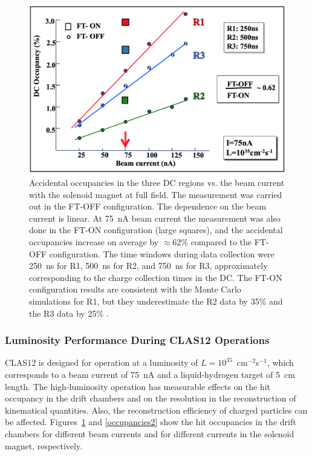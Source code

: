 \documentclass[final,3p]{elsarticle}
\begin{document}
\begin{twocolumn}
\begin{figure}[htbp!]
\centerline{\includegraphics[width=1.0\columnwidth]{random-occupancies.png}}
\caption{Accidental occupancies in the three DC regions vs. the beam current with the solenoid magnet at full field.
  The measurement was carried out in the FT-OFF configuration. The dependence on the beam current is linear.
  At 75~nA beam current the measurement was also done in the FT-ON configuration (large squares), and the
  accidental occupancies increase on average by $\approx$62\% compared to the FT-OFF configuration. The time
  windows during data collection were 250~ns for R1, 500~ns for R2, and 750~ns for R3, approximately corresponding
  to the charge collection times in the DC. The FT-ON configuration results are consistent with the Monte Carlo
  simulations for R1, but they underestimate the R2 data by 35\% and the R3 data by 25\%
  \cite{GEMC,GEMC-background}.}
\label{occupancies1}
\end{figure}

\subsubsection{Luminosity Performance During CLAS12 Operations}

CLAS12 is designed for operation at a luminosity of $L = 10^{35}$~cm$^{-2}$s$^{-1}$, which corresponds to a beam
current of 75~nA and a liquid-hydrogen target of 5~cm length. The high-luminosity operation has measurable effects
on the hit occupancy in the drift chambers and on the resolution in the reconstruction of kinematical quantities. Also,
the reconstruction efficiency of charged particles can be affected. Figures~\ref{occupancies1} and \ref{occupancies2}
show the hit occupancies in the drift chambers for different beam currents and for different currents in the solenoid
magnet, respectively.


\end{twocolumn}
\end{document}
